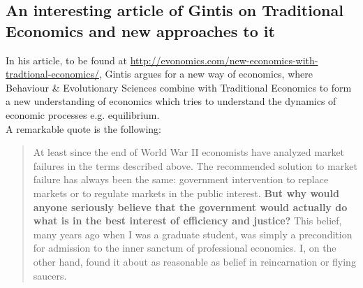 \subsection*{An interesting article of Gintis on Traditional Economics and new approaches to it}
In his article, to be found at \url{http://evonomics.com/new-economics-with-tradtional-economics/}, Gintis argues for a new way of economics, where Behaviour \& Evolutionary Sciences combine with Traditional Economics to form a new understanding of economics which tries to understand the dynamics of economic processes e.g. equilibrium. \\

A remarkable quote is the following:

\begin{quote}
At least since the end of World War II economists have analyzed market failures in the terms described above. The recommended solution to market failure has always been the same: government intervention to replace markets or to regulate markets in the public interest. \textbf{But why would anyone seriously believe that the government would actually do what is in the best interest of efficiency and justice?} This belief, many years ago when I was a graduate student, was simply a precondition for admission to the inner sanctum of professional economics. I, on the other hand, found it about as reasonable as belief in reincarnation or flying saucers.
\end{quote}